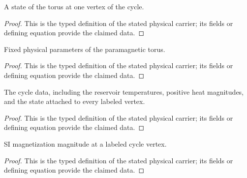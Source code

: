 \begin{definition}
  \label{def:physics:IPhO_2026_3_C_2:aux021}
  A state of the torus at one vertex of the cycle.
\end{definition}
\begin{proof}
  This is the typed definition of the stated physical carrier; its fields or defining equation provide the claimed data.
\end{proof}

\begin{definition}
  \label{def:physics:IPhO_2026_3_C_2:aux022}
  Fixed physical parameters of the paramagnetic torus.
\end{definition}
\begin{proof}
  This is the typed definition of the stated physical carrier; its fields or defining equation provide the claimed data.
\end{proof}

\begin{definition}
  \label{def:physics:IPhO_2026_3_C_2:aux023}
  The cycle data, including the reservoir temperatures, positive heat magnitudes, and the state attached to every labeled vertex.
\end{definition}
\begin{proof}
  This is the typed definition of the stated physical carrier; its fields or defining equation provide the claimed data.
\end{proof}

\begin{definition}
  \label{def:physics:IPhO_2026_3_C_2:aux024}
  SI magnetization magnitude at a labeled cycle vertex.
\end{definition}
\begin{proof}
  This is the typed definition of the stated physical carrier; its fields or defining equation provide the claimed data.
\end{proof}

